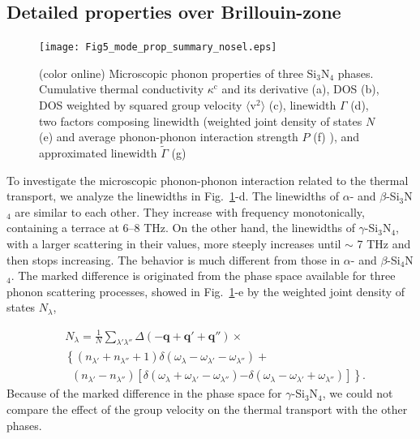 \documentclass[twocolumn,amsmath,amssymb,a4paper,prb,superscriptaddress,floatfix]{revtex4-1}
\begin{document}
\subsection{Detailed properties over Brillouin-zone}
\begin{figure}[ht]
 \begin{center}
  \texttt{[image: Fig5\_mode\_prop\_summary\_nosel.eps]}
  \caption{(color online) Microscopic phonon properties of three Si$_3$N$_4$
	  phases. Cumulative thermal conductivity $\kappa^\text{c}$ and its derivative
	  (a), DOS (b), DOS weighted by squared group velocity
	  $\langle\text{v}^2\rangle$ (c), linewidth $\Gamma$ (d), two factors
	  composing linewidth (weighted joint density of states $N$ (e) and average phonon-phonon
	  interaction strength $P$ (f) ), and approximated linewidth
	  $\tilde{\Gamma}$ (g) 
  \label{fig:Fig5_338_rev} }
 \end{center}
\end{figure}
To investigate the microscopic phonon-phonon interaction related to the thermal
transport, we analyze the linewidths in Fig.~\ref{fig:Fig5_338_rev}-d.
The linewidths of $\alpha$- and $\beta$-Si$_3$N$_4$ are similar to each other.
They increase with frequency monotonically, containing a terrace at 6--8 THz.
On the other hand, the linewidths of $\gamma$-Si$_3$N$_4$, with a larger
scattering in their values, more steeply increases until $\sim$ 7 THz and then
stops increasing.
The behavior is much different from those in $\alpha$- and $\beta$-Si$_4$N$_4$.
The marked difference is originated from the phase space available for three
phonon scattering processes, showed in Fig.~\ref{fig:Fig5_338_rev}-e by the
weighted joint density of states $N_\lambda$,

\begin{align}
 \label{eq:wjdos}
 &N_\lambda = \frac{1}{N}
  \sum_{\lambda' \lambda''}
  \Delta(-\mathbf{q}+\mathbf{q}'+\mathbf{q}'') \times \nonumber \\ 
 &\left\{ (n_{\lambda'} + n_{\lambda''}+1) 
   \delta(\omega_\lambda-\omega_{\lambda'}-\omega_{\lambda''}) \right.
   + \nonumber \\ 
 &\;\;(n_{\lambda'}-n_{\lambda''})
  \left[\delta(\omega_\lambda +\omega_{\lambda'}-\omega_{\lambda''})
 \right. 
 \left. -\left. \delta(\omega_\lambda - \omega_{\lambda'}+\omega_{\lambda''})
 \right]\right\}.
\end{align}
Because of the marked difference in the phase space for $\gamma$-Si$_3$N$_4$, we
could not compare the effect of the group velocity on the thermal transport with
the other phases.
\end{document}
